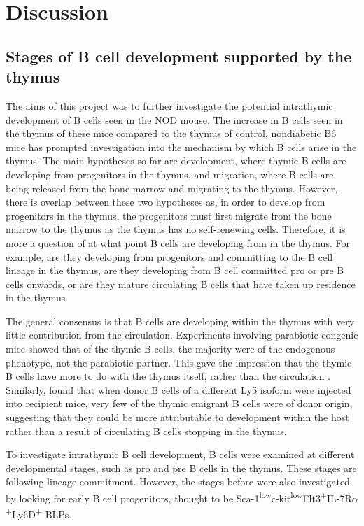 
\chapter{Discussion}

\section{Stages of B cell development supported by the thymus}
The aims of this project was to further investigate the potential intrathymic development of B cells seen in the NOD mouse.
The increase in B cells seen in the thymus of these mice compared to the thymus of control, nondiabetic B6 mice has prompted investigation into the mechanism by which B cells arise in the thymus.
The main hypotheses so far are development, where thymic B cells are developing from progenitors in the thymus, and migration, where B cells are being released from the bone marrow and migrating to the thymus.
However, there is overlap between these two hypotheses as, in order to develop from progenitors in the thymus, the progenitors must first migrate from the bone marrow to the thymus as the thymus has no self-renewing cells.
Therefore, it is more a question of at what point B cells are developing from in the thymus.
For example, are they developing from progenitors and committing to the B cell lineage in the thymus, are they developing from B cell committed pro or pre B cells onwards, or are they mature circulating B cells that have taken up residence in the thymus.

The general consensus is that B cells are developing within the thymus with very little contribution from the circulation.
Experiments involving parabiotic congenic mice showed that of the thymic B cells, the majority were of the endogenous phenotype, not the parabiotic partner. 
This gave the impression that the thymic B cells have more to do with the thymus itself, rather than the circulation \citep{Perera2013}.
Similarly, \citet{Akashi2000} found that when donor B cells of a different Ly5 isoform were injected into recipient mice, very few of the thymic emigrant B cells were of donor origin, suggesting that they could be more attributable to development within the host rather than a result of circulating B cells stopping in the thymus.

To investigate intrathymic B cell development, B cells were examined at different developmental stages, such as pro and pre B cells in the thymus.
These stages are following lineage commitment.
However, the stages before were also investigated by looking for early B cell progenitors, thought to be Sca-1\textsuperscript{low}c-kit\textsuperscript{low}Flt3\textsuperscript{+}IL-7R$\alpha$\textsuperscript{+}Ly6D\textsuperscript{+} BLPs.

